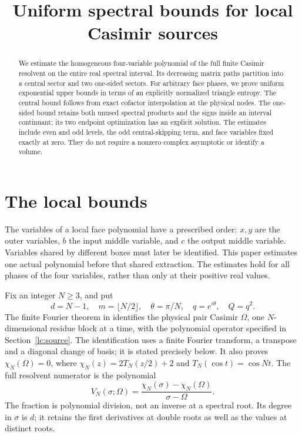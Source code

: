 \documentclass[11pt]{article}
\title{Uniform spectral bounds for local Casimir sources}
\author{}\date{}
\numberwithin{equation}{section}
\theoremstyle{remark}\newtheorem{remark}[theorem]{Remark}
\begin{document}
\maketitle
\begin{abstract}
We estimate the homogeneous four-variable polynomial of the full finite
Casimir resolvent on the entire real spectral interval. Its decreasing
matrix paths partition into a central sector and two one-sided sectors.
For arbitrary face phases, we prove uniform exponential upper bounds
in terms of an explicitly normalized triangle entropy. The central
bound follows from exact cofactor interpolation at the physical nodes.
The one-sided bound retains both unused spectral products and the signs
inside an interval continuant; its two endpoint optimization has an
explicit solution. The estimates include even and odd levels, the
odd central-skipping term, and face variables fixed exactly at zero.
They do not require a nonzero complex asymptotic or identify a volume.
\end{abstract}

\section{The local bounds}
The variables of a local face polynomial have a prescribed order:
\(x,y\) are the outer variables, \(b\) the input middle variable, and
\(c\) the output middle variable. Variables shared by different boxes
must later be identified. This paper estimates one actual polynomial
before that shared extraction. The estimates hold for all phases of
the four variables, rather than only at their positive real values.

Fix an integer \(N\ge3\), and put
\[
 d=N-1,\quad m=\lfloor N/2\rfloor,\quad
 \theta=\pi/N,\quad q=e^{i\theta},\quad Q=q^2.
\]
The finite Fourier theorem in \cite[Proposition 4.1 and
equations (4.4)--(4.5)]{FinitePaper} identifies the physical pair Casimir
\(\Omega\), one \(N\)-dimensional residue block at a time, with the
polynomial operator specified in Section~\ref{lc:source}. The identification
uses a finite Fourier transform, a transpose and a diagonal change of basis;
it is stated precisely below. It also proves \(\chi_N(\Omega)=0\), where
\(\chi_N(z)=2T_N(z/2)+2\) and \(T_N(\cos t)=\cos Nt\).
The full resolvent numerator is the polynomial
\[
 V_N(\sigma;\Omega)
       =\frac{\chi_N(\sigma)-\chi_N(\Omega)}{\sigma-\Omega}.
\]
The fraction is polynomial division, not an inverse at a spectral root.
Its degree in \(\sigma\) is \(d\); it retains the first derivatives at
double roots as well as the values at distinct roots.
\end{document}
